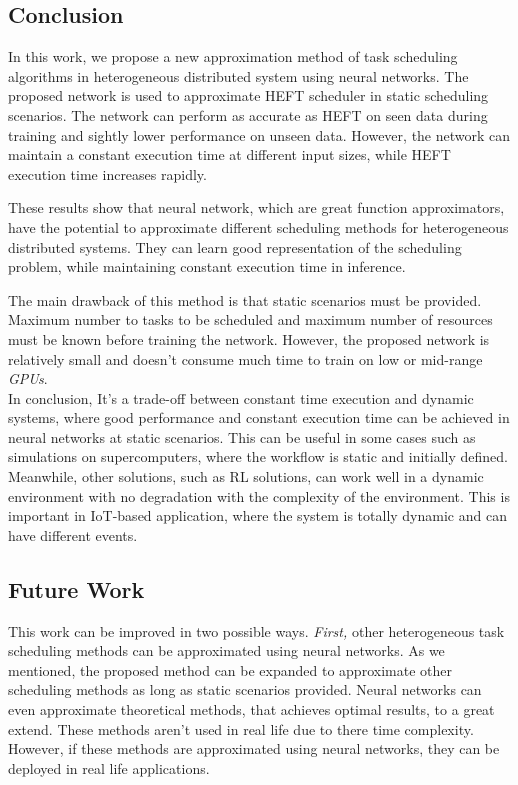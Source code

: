 \subsection{Conclusion}

In this work, we propose a new approximation method of task scheduling algorithms in heterogeneous distributed system using neural networks. The proposed network is used to approximate HEFT scheduler in static scheduling scenarios. The network can perform as accurate as HEFT on seen data during training and sightly lower performance on unseen data. However, the network can maintain a constant execution time at different input sizes, while HEFT execution time increases rapidly. 

These results show that neural network, which are great function approximators, have the potential to approximate different scheduling methods for heterogeneous distributed systems. They can learn good representation of the scheduling problem, while maintaining constant execution time in inference. 

The main drawback of this method is that static scenarios must be provided. Maximum number to tasks to be scheduled and maximum number of resources must be known before training the network. However, the proposed network is relatively small and doesn't consume much time to train on low or mid-range \emph{GPUs}. \\

In conclusion, It's a trade-off between constant time execution and dynamic systems, where good performance and constant execution time can be achieved in neural networks at static scenarios. This can be useful in some cases such as simulations on supercomputers, where the workflow is static and initially defined. Meanwhile, other solutions, such as RL solutions, can work well in a dynamic environment with no degradation with the complexity of the environment. This is important in IoT-based application, where the system is totally dynamic and can have different events.

\subsection{Future Work}

This work can be improved in two possible ways. \emph{First,} other heterogeneous task scheduling methods can be approximated using neural networks. As we mentioned, the proposed method can be expanded to approximate other scheduling methods as long as static scenarios provided. Neural networks can even approximate theoretical methods, that achieves optimal results, to a great extend. These methods aren't used in real life due to there time complexity. However, if these methods are approximated using neural networks, they can be deployed in real life applications. 

